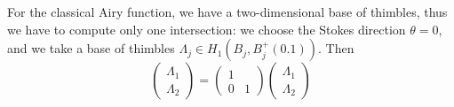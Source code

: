 \documentclass{article}
\theoremstyle{definition}
\begin{document}
For the classical Airy function, we have a two-dimensional base of thimbles, thus we have to compute only one intersection: we choose the Stokes direction $\theta=0$, and we take a base of thimbles $\Lambda_j\in H_1(B_j,B_j^+(0.1))$. Then 
\begin{equation}
    \begin{pmatrix}
        \Lambda_1\\
        \Lambda_2
    \end{pmatrix} = \begin{pmatrix}
        1 & \\
        0 & 1
    \end{pmatrix}\begin{pmatrix}
        \Lambda_1\\
        \Lambda_2
    \end{pmatrix}
\end{equation}
\end{document}
